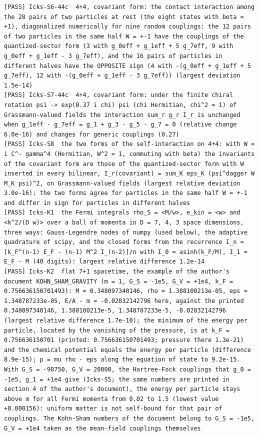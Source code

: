 \documentclass[
  10pt,
]{article}
\begin{document}
\begin{verbatim}
[PASS] Icks-S6-44c  4+4, covariant form: the contact interaction among the 28 pairs of two particles at rest (the eight states with beta = +1), diagonalized numerically for nine random couplings: the 12 pairs of two particles in the same half W = +-1 have the couplings of the quantized-sector form (3 with g_0eff + g_1eff + 5 g_7eff, 9 with g_0eff + g_1eff - 3 g_7eff), and the 16 pairs of particles in different halves have the OPPOSITE sign (4 with -(g_0eff + g_1eff + 5 g_7eff), 12 with -(g_0eff + g_1eff - 3 g_7eff)) (largest deviation 1.5e-14)
[PASS] Icks-S7-44c  4+4, covariant form: under the finite chiral rotation psi -> exp(0.37 i chi) psi (chi Hermitian, chi^2 = 1) of Grassmann-valued fields the interaction sum_r g_r I_r is unchanged when g_1eff - g_7eff = g_1 + g_3 - g_5 - g_7 = 0 (relative change 6.0e-16) and changes for generic couplings (0.27)
[PASS] Icks-S8  the two forms of the self-interaction on 4+4: with W = i C^- gamma^4 (Hermitian, W^2 = 1, commuting with beta) the invariants of the covariant form are those of the quantized-sector form with W inserted in every bilinear, I_r(covariant) = sum_K eps_K (psi^dagger W M_K psi)^2, on Grassmann-valued fields (largest relative deviation 3.0e-16): the two forms agree for particles in the same half W = +-1 and differ in sign for particles in different halves
[PASS] Icks-K1  the Fermi integrals rho_S = <M/w>, e_kin = <w> and <k^2/(D w)> over a ball of momenta in D = 7, 4, 3 space dimensions, three ways: Gauss-Legendre nodes of numpy (used below), the adaptive quadrature of scipy, and the closed forms from the recurrence I_n = [k_F^(n-1) E_F - (n-1) M^2 I_(n-2)]/n with I_0 = asinh(k_F/M), I_1 = E_F - M (40 digits): largest relative difference 1.2e-14
[PASS] Icks-K2  flat 7+1 spacetime, the example of the author's document KOHN_SHAM_GRAVITY (m = 1, G_S = -1e5, G_V = +1e4, k_F = 0.756636150701493): M = 0.348097340146, rho = 1.388100213e-05, eps = 1.348787233e-05, E/A - m = -0.02832142796 here, against the printed 0.348097340146, 1.388100213e-5, 1.348787233e-5, -0.02832142796 (largest relative difference 1.7e-10); the minimum of the energy per particle, located by the vanishing of the pressure, is at k_F = 0.756636150701 (printed: 0.756636150701493; pressure there 1.3e-21) and the chemical potential equals the energy per particle (difference 8.9e-15); p = mu rho - eps along the equation of state to 9.2e-15. With G_S = -98750, G_V = 20000, the Hartree-Fock couplings that g_0 = -1e5, g_1 = +1e4 give (Icks-S5; the same numbers are printed in section 4 of the author's document), the energy per particle stays above m for all Fermi momenta from 0.02 to 1.5 (lowest value +0.000156): uniform matter is not self-bound for that pair of couplings. The Kohn-Sham numbers of the document belong to G_S = -1e5, G_V = +1e4 taken as the mean-field couplings themselves

\end{verbatim}
\end{document}
